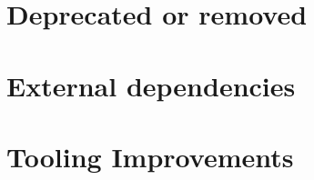 \hypertarget{4235524591664155207}{}


\chapter{Deprecated or removed}



\hypertarget{1328894012787811563}{}


\chapter{External dependencies}



\hypertarget{17774285514509357554}{}


\chapter{Tooling Improvements}

